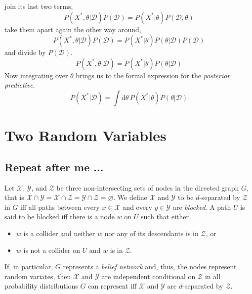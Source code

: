 \documentclass[]{report}
\begin{document}
join its last two terms,
\begin{equation}
P( X^*, \theta | \mathcal{D} )
P( \mathcal{D} )
= 
P( X^* | \theta )
P( \mathcal{D}, \theta )
\end{equation}
take them apart again the other way around,
\begin{equation}
P( X^*, \theta | \mathcal{D} )
P( \mathcal{D} ) 
= 
P( X^* | \theta )
P( \theta | \mathcal{D} )
P( \mathcal{D} )
\end{equation}
and divide by $P(\mathcal{D})$.
\begin{equation}
P( X^*, \theta | \mathcal{D} ) 
= 
P( X^* | \theta )
P( \theta | \mathcal{D} )
\end{equation}
Now integrating over $\theta$ brings us to the formal expression for the \emph{posterior predictive}.
\begin{equation} \label{eq:post_pred}
P( X^* | \mathcal{D} ) 
= 
\int \mathrm{d}\theta \,
	P( X^* | \theta )
	P( \theta | \mathcal{D} )
\end{equation}


\chapter{Two Random Variables}
\section{Repeat after me ...} \label{sect:d-connect}
Let $\mathcal{X}$, $\mathcal{Y}$, and $\mathcal{Z}$ be three non-intersecting sets of nodes in the directed graph $G$, that is $\mathcal{X}\cap\mathcal{Y} = \mathcal{X}\cap\mathcal{Z} = \mathcal{Y}\cap\mathcal{Z} = \varnothing$. We define
$\mathcal{X}$ and $\mathcal{Y}$ to be $d$-separated by $\mathcal{Z}$ in $G$ iff all paths between every $x \in \mathcal{X}$ and every $y \in \mathcal{Y}$ are \emph{blocked}. A path $U$ is said to be blocked iff there is a node $w$ on $U$ such that either
\begin{itemize}
	\item $w$ is a collider and neither $w$ nor any of its descendants is in $\mathcal{Z}$, or
	\item $w$ is not a collider on $U$ and $w$ is in $\mathcal{Z}$.
\end{itemize}
If, in particular, $G$ represents a \emph{belief network} and, thus, the nodes represent random variates, then $\mathcal{X}$ and $\mathcal{Y}$ are independent conditional on $\mathcal{Z}$ in all probability distributions $G$ can represent iff $\mathcal{X}$ and $\mathcal{Y}$ are $d$-separated by $\mathcal{Z}$.
\end{document}
